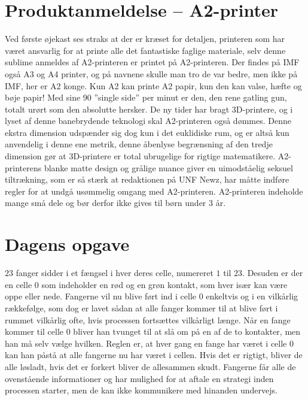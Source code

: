 \begin{minipage}[t]{100mm}
\vspace{1mm}
\section*{Produktanmeldelse -- A2-printer}
Ved første øjekast ses straks at der er kræset for detaljen, printeren som har været ansvarlig for at printe alle det fantastiske faglige materiale, selv denne sublime anmeldes af A2-printeren er printet på A2-printeren.  Der findes på IMF også A3 og A4 printer, og på navnene skulle man tro de var bedre, men ikke på IMF, her er A2 konge. Kun A2 kan printe A2 papir, kun den kan valse, hæfte og bøje papir! Med sine 90 ”single side” per minut er den, den rene gatling gun, totalt urørt som den absolutte hersker. De ny tider har bragt 3D-printere, og i lyset af denne banebrydende teknologi skal A2-printeren også dømmes. Denne ekstra dimension udspænder sig dog kun i det euklidiske rum, og er altså kun anvendelig i denne ene metrik, denne åbenlyse begrænsning af den tredje dimension gør at 3D-printere er total ubrugelige for rigtige matematikere.  A2-printerens blanke matte design og grålige nuance giver en uimodståelig seksuel tiltrækning, som er så stærk at redaktionen på UNF Newz, har måtte indføre regler for at undgå usømmelig omgang med A2-printeren. 
A2-printeren indeholde mange små dele og bør derfor ikke gives til børn under 3 år.

\vspace{1mm}
\section*{Dagens opgave}
$23$ fanger sidder i et fængsel i hver deres celle, numereret $1$ til $23$. Desuden er der en celle $0$ som indeholder en rød og en grøn kontakt, som hver især kan være oppe eller nede. Fangerne vil nu blive ført ind i celle $0$ enkeltvis og i en vilkårlig rækkefølge, som dog er lavet sådan at alle fanger kommer til at blive ført i rummet vilkårlig ofte, hvis processen fortsættes vilkårligt længe. Når en fange kommer til celle $0$ bliver han tvunget til at slå om på en af de to kontakter, men han må selv vælge hvilken. Reglen er, at hver gang en fange har været i celle $0$ kan han påstå at alle fangerne nu har været i cellen. Hvis det er rigtigt, bliver de alle løsladt, hvis det er forkert bliver de allesammen skudt. Fangerne får alle de ovenstående informationer og har mulighed for at aftale en strategi inden processen starter, men de kan ikke kommunikere med hinanden undervejs.


\end{minipage}
